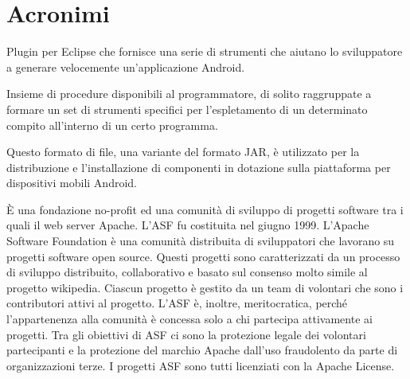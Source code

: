 {}
\chapter*{Acronimi}
\begin{acronym}[HTML5]
	
	{\small Plugin per Eclipse che fornisce una serie di strumenti che aiutano lo sviluppatore a generare velocemente un'applicazione Android. \par}
	
	
	{\small Insieme di procedure disponibili al programmatore, di solito raggruppate a formare un set di strumenti specifici per l'espletamento di un determinato compito all'interno di un certo programma. \par}
	
	
	{\small Questo formato di file, una variante del formato \ac{JAR}, è utilizzato per la distribuzione e l'installazione di componenti in dotazione sulla piattaforma per dispositivi mobili Android.  \par}
	
	
	{\small È una fondazione no-profit ed una comunità di sviluppo di progetti software tra i quali il web server Apache. L'ASF fu costituita nel giugno 1999. L'Apache Software Foundation è una comunità distribuita di sviluppatori che lavorano su progetti software open source. Questi progetti sono caratterizzati da un processo di sviluppo distribuito, collaborativo e basato sul consenso molto simile al progetto wikipedia. Ciascun progetto è gestito da un team di volontari che sono i contributori attivi al progetto. L'ASF è, inoltre, meritocratica, perché l'appartenenza alla comunità è concessa solo a chi partecipa attivamente ai progetti. Tra gli obiettivi di ASF ci sono la protezione legale dei volontari partecipanti e la protezione del marchio Apache dall'uso fraudolento da parte di organizzazioni terze. I progetti ASF sono tutti licenziati con la Apache License. \par}
	

\end{acronym}
